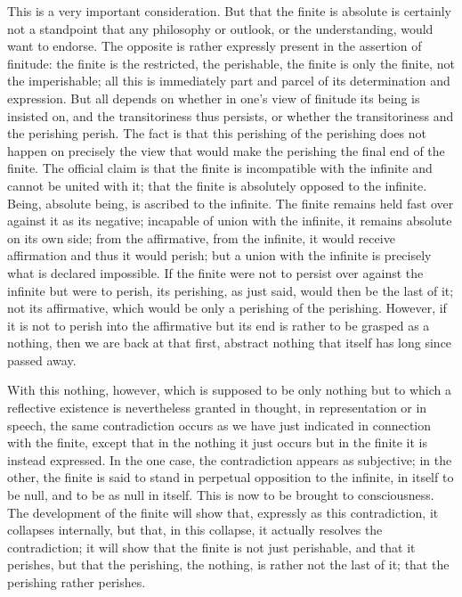 This is a very important consideration.
But that the finite is absolute is
certainly not a standpoint that any philosophy or outlook,
or the understanding, would want to endorse.
The opposite is rather expressly present
in the assertion of finitude:
the finite is the restricted, the perishable,
the finite is only the finite, not the imperishable;
all this is immediately part and parcel
of its determination and expression.
But all depends on whether
in one's view of finitude its being is insisted on,
and the transitoriness thus persists,
or whether the transitoriness and the perishing perish.
The fact is that this perishing of the perishing does not happen
on precisely the view that would make
the perishing the final end of the finite.
The official claim is that the finite is
incompatible with the infinite
and cannot be united with it;
that the finite is absolutely opposed to the infinite.
Being, absolute being, is ascribed to the infinite.
The finite remains held fast over against it as its negative;
incapable of union with the infinite,
it remains absolute on its own side;
from the affirmative, from the infinite,
it would receive affirmation and thus it would perish;
but a union with the infinite is precisely
what is declared impossible.
If the finite were not to persist over against the infinite
but were to perish, its perishing, as just said,
would then be the last of it;
not its affirmative, which would be only
a perishing of the perishing.
However, if it is not to perish into the affirmative
but its end is rather to be grasped as a nothing,
then we are back at that first, abstract nothing
that itself has long since passed away.

With this nothing, however, which is supposed to be only nothing
but to which a reflective existence is nevertheless granted
in thought, in representation or in speech,
the same contradiction occurs as we have
just indicated in connection with the finite,
except that in the nothing it just occurs
but in the finite it is instead expressed.
In the one case, the contradiction appears as subjective;
in the other, the finite is said to stand
in perpetual opposition to the infinite,
in itself to be null, and to be as null in itself.
This is now to be brought to consciousness.
The development of the finite will show that,
expressly as this contradiction, it collapses internally,
but that, in this collapse, it actually resolves the contradiction;
it will show that the finite is not just perishable, and that it perishes,
but that the perishing, the nothing, is rather not the last of it;
that the perishing rather perishes.

